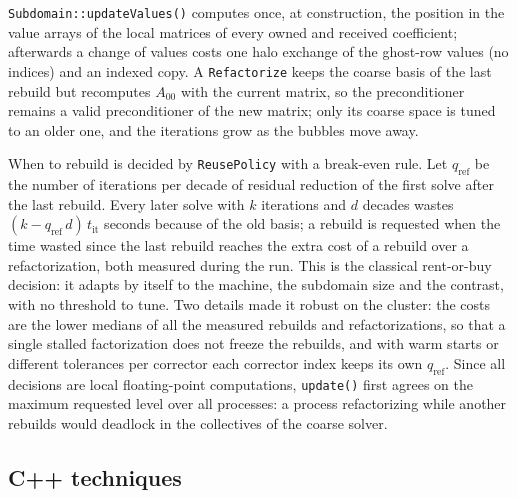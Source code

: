 \documentclass[11pt,a4paper]{article}
\begin{document}
\texttt{Subdomain::updateValues()} computes once, at construction, the position in the value arrays of the
local matrices of every owned and received coefficient; afterwards a change of values costs one halo
exchange of the ghost-row values (no indices) and an indexed copy. A \texttt{Refactorize} keeps the coarse
basis of the last rebuild but recomputes $A_{00}$ with the current matrix, so the preconditioner remains a
valid preconditioner of the new matrix; only its coarse space is tuned to an older one, and the iterations
grow as the bubbles move away.

When to rebuild is decided by \texttt{ReusePolicy} with a break-even rule. Let $q_{\mathrm{ref}}$ be the
number of iterations per decade of residual reduction of the first solve after the last rebuild. Every later
solve with $k$ iterations and $d$ decades wastes $(k-q_{\mathrm{ref}}\,d)\,t_{\mathrm{it}}$ seconds because of
the old basis; a rebuild is requested when the time wasted since the last rebuild reaches the extra cost of
a rebuild over a refactorization, both measured during the run. This is the classical rent-or-buy decision:
it adapts by itself to the machine, the subdomain size and the contrast, with no threshold to tune. Two
details made it robust on the cluster: the costs are the lower medians of all the measured rebuilds and
refactorizations, so that a single stalled factorization does not freeze the rebuilds, and with warm starts or
different tolerances per corrector each corrector index keeps its own $q_{\mathrm{ref}}$. Since all decisions
are local floating-point computations, \texttt{update()} first agrees on the maximum requested level over all
processes: a process refactorizing while another rebuilds would deadlock in the collectives of the coarse
solver.

\subsection{C++ techniques}\label{sec:cpp}
\end{document}
